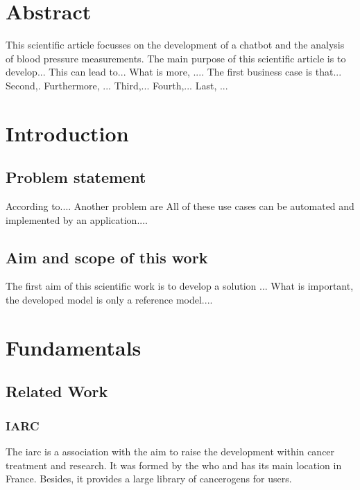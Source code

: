 



\chapter{Abstract}\label{abstract}

This scientific article focusses on the development of a chatbot and the analysis of blood pressure measurements.
The main purpose of this scientific article is to develop...
This can lead to...
What is more, .... 
The first business case is that...
Second,. 
Furthermore, ...
Third,...
Fourth,...
Last, ...

\chapter{Introduction}\label{introduction}

\section{Problem statement}
According to....
Another problem are 
All of these use cases can be automated and implemented by an application....

\section{Aim and scope of this work}
The first aim of this scientific work is to develop a solution ...
What is important, the developed model is only a reference model....

\chapter{Fundamentals}\label{fundamentals}

\section{Related Work}

\subsection{\ac{IARC}}

The \ac{iarc} is a association with the aim to raise the development within cancer treatment and research. It was formed by the \ac{who} and has its main location in France. Besides, it provides a large library of cancerogens for users.

